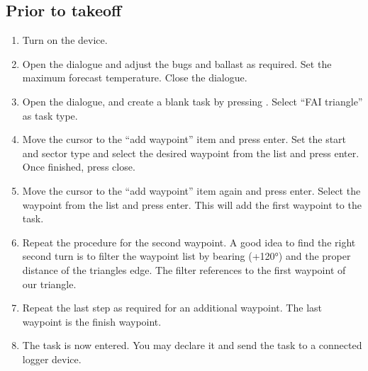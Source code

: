 \subsection*{Prior to takeoff}
\begin{enumerate}
\item  Turn on the device.
\item  Open the  dialogue and adjust the bugs and ballast as
  required. Set the maximum forecast temperature.  Close the dialogue.
\item  Open the  dialogue, and create a blank task by pressing
. Select ``FAI triangle'' as task type.
\item  Move the cursor to the ``add waypoint'' item and press enter.  Set the
  start and sector type and select the desired waypoint from the list and press 
  enter.  Once finished, press close.
\item  Move the cursor to the ``add waypoint'' item again and press enter. 
  Select the waypoint from the list and press enter.  This will add the first 
  waypoint to the task.
\item  Repeat the procedure for the second waypoint. A good idea to find the
  right second turn is to filter the waypoint list by bearing (+120°) and the
  proper distance of the triangles edge. The filter references to
  the first waypoint of our triangle.
\item  Repeat the last step as required for an additional waypoint.  The last
  waypoint is the finish waypoint.
\item  The task is now entered.  You may declare it and send the task to a
  connected logger device.
\end{enumerate}


